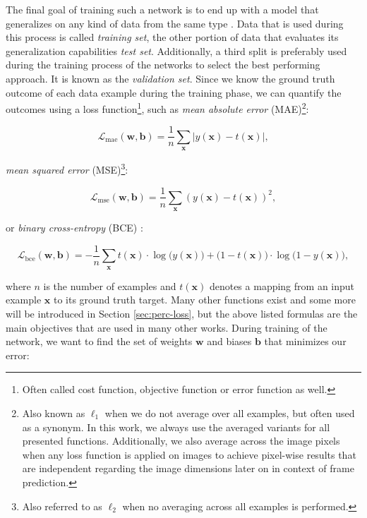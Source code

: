The final goal of training such a network is to end up with a model that generalizes on any kind of data from the same type \parencite[p. 2]{pattern_and_ml}. Data that is used during this process is called \textit{training set}, the other portion of data that evaluates its generalization capabilities \textit{test set}. Additionally, a third split is preferably used during the training process of the networks to select the best performing approach. It is known as the \textit{validation set}. Since we know the ground truth outcome of each data example during the training phase, we can quantify the outcomes using a loss function\footnote{Often called cost function, objective function or error function as well.}, such as \textit{mean absolute error} (MAE)\footnote{Also known as $ \ell_1 $ when we do not average over all examples, but often used as a synonym. In this work, we always use the averaged variants for all presented functions. Additionally, we also average across the image pixels when any loss function is applied on images to achieve pixel-wise results that are independent regarding the image dimensions later on in context of frame prediction.}:

\begin{equation} \label{eq:mae}
  \mathcal{L}_{\textrm{mae}}(\textbf{w}, \textbf{b})=\frac{1}{n} \sum\limits_{\textbf{x}} | y(\textbf{x}) - t(\textbf{x}) | ,
\end{equation}

\textit{mean squared error} (MSE)\footnote{Also referred to as $ \ell_2 $ when no averaging across all examples is performed.}:

\begin{equation} \label{eq:mse}
  \mathcal{L}_{\textrm{mse}}(\textbf{w}, \textbf{b})=\frac{1}{n} \sum\limits_{\textbf{x}} ( y(\textbf{x}) - t(\textbf{x}) )^2 ,
\end{equation}

or \textit{binary cross-entropy} (BCE) \parencite{conv_lstm_nowcasting}:

\begin{equation} \label{eq:bce}
  \mathcal{L}_{\textrm{bce}}(\textbf{w}, \textbf{b})= -\frac{1}{n} \sum\limits_{\textbf{x}} t(\textbf{x}) \cdot \log{\big(y(\textbf{x})\big)} + \big(1-t(\textbf{x})\big) \cdot \log{\big(1-y(\textbf{x})\big)} ,
\end{equation}

where $ n $ is the number of examples and $ t(\textbf{x}) $ denotes a mapping from an input example $ \textbf{x} $ to its ground truth target. Many other functions exist and some more will be introduced in Section \ref{sec:perc-loss}, but the above listed formulas are the main objectives that are used in many other works. During training of the network, we want to find the set of weights $ \textbf{w} $ and biases $ \textbf{b} $ that minimizes our error:

